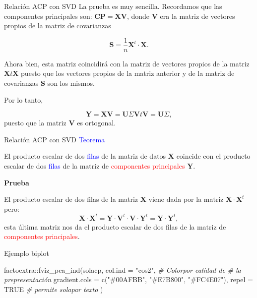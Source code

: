 \documentclass[
  ignorenonframetext,
]{beamer}
\newenvironment{Shaded}{\begin{snugshade}}{\end{snugshade}}
\newcommand{\AttributeTok}[1]{\textcolor[rgb]{0.77,0.63,0.00}{#1}}
\newcommand{\CommentTok}[1]{\textcolor[rgb]{0.56,0.35,0.01}{\textit{#1}}}
\newcommand{\ConstantTok}[1]{\textcolor[rgb]{0.00,0.00,0.00}{#1}}
\newcommand{\FunctionTok}[1]{\textcolor[rgb]{0.00,0.00,0.00}{#1}}
\newcommand{\NormalTok}[1]{#1}
\newcommand{\SpecialCharTok}[1]{\textcolor[rgb]{0.00,0.00,0.00}{#1}}
\newcommand{\StringTok}[1]{\textcolor[rgb]{0.31,0.60,0.02}{#1}}
\newcommand\blue[1]{\textcolor{blue}{#1}}
\newcommand\red[1]{\textcolor{red}{#1}}
\begin{document}
\begin{frame}{Relación ACP con SVD}
\protect\hypertarget{relaciuxf3n-acp-con-svd-2}{}
La prueba es muy sencilla. Recordamos que las componentes principales
son: \(\mathbf{CP}=\mathbf{X}\mathbf{V}\), donde \(\mathbf{V}\) era la
matriz de vectores propios de la matriz de covarianzas

\[\mathbf{S}=\frac{1}{n}\mathbf{X}^t\cdot \mathbf{X}.\]

Ahora bien, esta matriz coincidirá con la matriz de vectores propios de
la matriz \(\mathbf{X}t\mathbf{X}\) puesto que los vectores propios de
la matriz anterior y de la matriz de covarianzas \(\mathbf{S}\) son los
mismos.

Por lo tanto,

\[\mathbf{Y}=\mathbf{X}\mathbf{V}=\mathbf{U}\Sigma\mathbf{V}t\mathbf{V}=\mathbf{U}\Sigma,\]
puesto que la matriz \(\mathbf{V}\) es ortogonal.
\end{frame}

\begin{frame}{Relación ACP con SVD}
\protect\hypertarget{relaciuxf3n-acp-con-svd-3}{}
\blue{Teorema}

El producto escalar de dos \blue{filas} de la matriz de datos
\(\mathbf{X}\) coincide con el producto escalar de dos \blue{filas} de
la matriz de \red{componentes principales} \(\mathbf{Y}\).

\textbf{Prueba}

El producto escalar de dos filas de la matriz \(\mathbf{X}\) viene dada
por la matriz \(\mathbf{X}\cdot\mathbf{X}^t\) pero: \[
\mathbf{X}\cdot \mathbf{X}^t= \mathbf{Y}\cdot \mathbf{V}^t\cdot\mathbf{V}\cdot\mathbf{Y}^t=\mathbf{Y}\cdot\mathbf{Y}^t,
\] esta última matriz nos da el producto escalar de dos filas de la
matriz de \red{componentes principales}.
\end{frame}

\begin{frame}[fragile]{Ejemplo biplot}
\protect\hypertarget{ejemplo-biplot}{}
\begin{Shaded}
\begin{Highlighting}[]
\NormalTok{factoextra}\SpecialCharTok{::}\FunctionTok{fviz\_pca\_ind}\NormalTok{(solacp,}
             \AttributeTok{col.ind =} \StringTok{"cos2"}\NormalTok{, }
             \CommentTok{\# Colorpor calidad de }
             \CommentTok{\# la prepresentación}
             \AttributeTok{gradient.cols =}
                     \FunctionTok{c}\NormalTok{(}\StringTok{"\#00AFBB"}\NormalTok{, }
                       \StringTok{"\#E7B800"}\NormalTok{, }\StringTok{"\#FC4E07"}\NormalTok{),}
             \AttributeTok{repel =} \ConstantTok{TRUE}
             \CommentTok{\# permite  solapar texto}
\NormalTok{             )}
\end{Highlighting}
\end{Shaded}
\end{frame}
\end{document}
